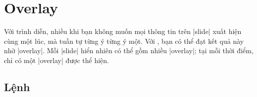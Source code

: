 \section{Overlay}
\label{sec:overlays}

Với trình diễn, nhiều khi bạn không muốn mọi thông tin trên |slide|
xuất hiện cùng một lúc, mà tuần tự từng ý từng ý một. Với ,
bạn có thể đạt kết quả này nhờ |overlay|. Mỗi |slide| hiển nhiên
có thể gồm nhiều |overlay|; tại mỗi thời điểm, chỉ có một |overlay|
được thể hiện.


\subsection{\texorpdfstring{Lệnh}{Lenh} }

\label{sec:pause}


